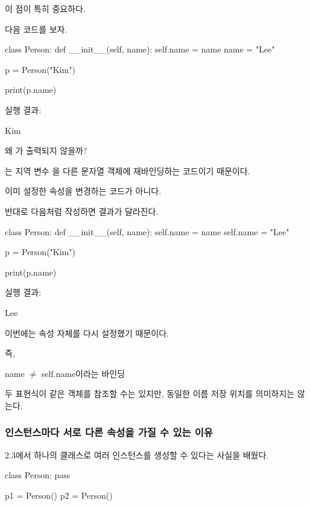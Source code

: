 이 점이 특히 중요하다.

다음 코드를 보자.

\begin{dhkcode}
class Person:
    def __init__(self, name):
        self.name = name
        name = "Lee"

p = Person("Kim")

print(p.name)
\end{dhkcode}

실행 결과:

\begin{dhkzsh}
Kim
\end{dhkzsh}

왜 가 출력되지 않을까?

는 지역 변수 을 다른 문자열 객체에 재바인딩하는 코드이기 때문이다.

이미 설정한  속성을 변경하는 코드가 아니다.

반대로 다음처럼 작성하면 결과가 달라진다.

\begin{dhkcode}
class Person:
    def __init__(self, name):
        self.name = name
        self.name = "Lee"

p = Person("Kim")

print(p.name)
\end{dhkcode}

실행 결과:

\begin{dhkzsh}
Lee
\end{dhkzsh}

이번에는  속성 자체를 다시 설정했기 때문이다.

즉,

\begin{dhksmry}[centered]
name $\neq$ self.name이라는 바인딩
\end{dhksmry}

두 표현식이 같은 객체를 참조할 수는 있지만, 동일한 이름 저장 위치를 의미하지는 않는다.

\subsubsection{인스턴스마다 서로 다른 속성을 가질 수 있는 이유}

2.3에서 하나의 클래스로 여러 인스턴스를 생성할 수 있다는 사실을 배웠다.

\begin{dhkcode}
class Person:
    pass

p1 = Person()
p2 = Person()
\end{dhkcode}

